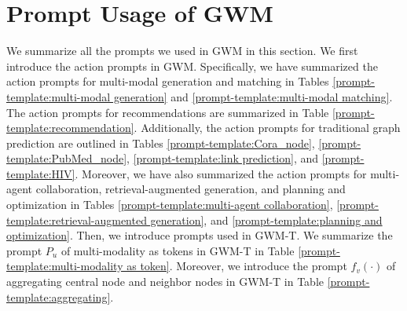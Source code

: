\begin{table}[ht]
\caption{Hyper-parameter configuration for model training.}\label{apx:tab:hyper}
\centering
{}
\end{table}

 
\section{Prompt Usage of GWM} \label{sec:prompt}

We summarize all the prompts we used in GWM in this section. We first introduce the action prompts in GWM. Specifically, we have summarized the action prompts for multi-modal generation and matching in Tables \ref{prompt-template:multi-modal generation} and \ref{prompt-template:multi-modal matching}. The action prompts for recommendations are summarized in Table \ref{prompt-template:recommendation}. Additionally, the action prompts for traditional graph prediction are outlined in Tables \ref{prompt-template:Cora_node}, \ref{prompt-template:PubMed_node}, \ref{prompt-template:link prediction}, and \ref{prompt-template:HIV}. Moreover, we have also summarized the action prompts for multi-agent collaboration, retrieval-augmented generation, and planning and optimization in Tables \ref{prompt-template:multi-agent collaboration}, \ref{prompt-template:retrieval-augmented generation}, and \ref{prompt-template:planning and optimization}.  Then, we introduce prompts used in GWM-T. We summarize the prompt $P_{u}$ of multi-modality as tokens in GWM-T in Table \ref{prompt-template:multi-modality as token}. Moreover, we introduce the prompt $f_{v}(\cdot)$ of aggregating central node and neighbor nodes in GWM-T in Table \ref{prompt-template:aggregating}.

